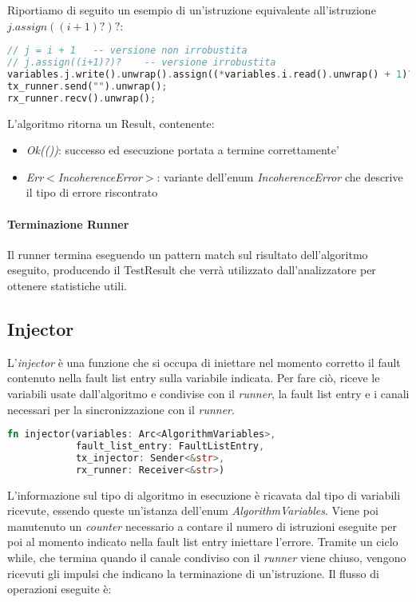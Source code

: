 Riportiamo di seguito un esempio di un'istruzione equivalente all'istruzione $j.assign((i+1)?)?$:
\begin{lstlisting}[language=Rust, style=boxed]
// j = i + 1   -- versione non irrobustita
// j.assign((i+1)?)?    -- versione irrobustita
variables.j.write().unwrap().assign((*variables.i.read().unwrap() + 1)?)?;
tx_runner.send("").unwrap();
rx_runner.recv().unwrap();
\end{lstlisting}

L'algoritmo ritorna un Result, contenente:
\begin{itemize}
    \item \textit{Ok(())}: successo ed esecuzione portata a termine correttamente'
    \item \textit{Err$<$IncoherenceError$>$}: variante dell'enum \textit{IncoherenceError} che descrive il tipo di errore riscontrato 
\end{itemize}

\paragraph{Terminazione Runner}
Il runner termina eseguendo un pattern match sul risultato dell'algoritmo eseguito, producendo il TestResult che verrà utilizzato dall'analizzatore per ottenere statistiche utili.

\subsection{Injector}
L'\textit{injector} è una funzione che si occupa di iniettare nel momento corretto il fault contenuto nella fault list entry sulla variabile indicata. Per fare ciò, riceve le variabili usate dall'algoritmo e condivise con il \textit{runner}, la fault list entry e i canali necessari per la sincronizzazione con il \textit{runner}.

\begin{lstlisting}[language=Rust, style=boxed]
fn injector(variables: Arc<AlgorithmVariables>, 
            fault_list_entry: FaultListEntry,
            tx_injector: Sender<&str>,
            rx_runner: Receiver<&str>)
\end{lstlisting}

L'informazione sul tipo di algoritmo in esecuzione è ricavata dal tipo di variabili ricevute, essendo queste un'istanza dell'enum \textit{AlgorithmVariables}. Viene poi manutenuto un \textit{counter} necessario a contare il numero di istruzioni eseguite per poi al momento indicato nella fault list entry iniettare l'errore. Tramite un ciclo while, che termina quando il canale condiviso con il \textit{runner} viene chiuso, vengono ricevuti gli impulsi che indicano la terminazione di un'istruzione. Il flusso di operazioni eseguite è: 

